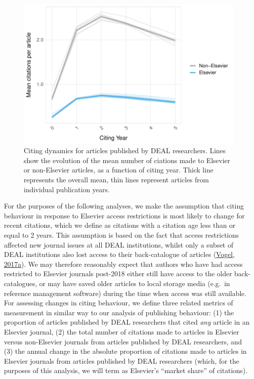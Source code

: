 \documentclass[
]{article}
\begin{document}
\begin{figure}

{\centering \includegraphics[width=0.5\linewidth]{analysis_files/figure-latex/references-publisher-year-cityear-1} 

}

\caption{Citing dynamics for articles published by DEAL researchers. Lines show the evolution of the mean number of ciations made to Elsevier or non-Elsevier articles, as a function of citing year. Thick line represents the overall mean, thin lines represent articles from individual publication years.}\label{fig:references-publisher-year-cityear}
\end{figure}

For the purposes of the following analyses, we make the assumption that citing behaviour in response to Elsevier access restrictions is most likely to change for recent citations, which we define as citations with a citation age less than or equal to 2 years. This assumption is based on the fact that access restrictions affected new journal issues at all DEAL institutions, whilst only a subset of DEAL institutions also lost access to their back-catalogue of articles (\href{https://doi.org/10.1126/science.355.6320.17}{Vogel, 2017a}). We may therefore reasonably expect that authors who have had access restricted to Elsevier journals post-2018 either still have access to the older back-catalogues, or may have saved older articles to local storage media (e.g.~in reference management software) during the time when access was still available. For assessing changes in citing behaviour, we define three related metrics of measurement in similar way to our analysis of publishing behaviour: (1) the proportion of articles published by DEAL researchers that cited \emph{any} article in an Elsevier journal, (2) the total number of citations made to articles in Elsevier versus non-Elsevier journals from articles published by DEAL researchers, and (3) the annual change in the absolute proportion of citations made to articles in Elsevier journals from articles published by DEAL researchers (which, for the purposes of this analysis, we will term as Elsevier's ``market share'' of citations).
\end{document}
